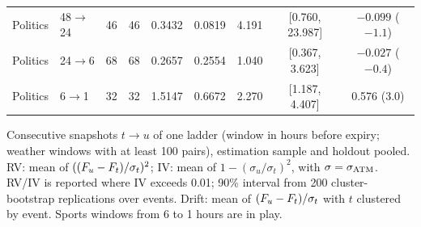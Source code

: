 \begin{table}[ht]
\begin{threeparttable}
\begin{tabular}{@{}llrrccccc@{}}
Politics & 48$\to$24 & 46 & 46 & 0.3432 & 0.0819 & 4.191 & [0.760, 23.987] & $-0.099$ ($-1.1$) \\
Politics & 24$\to$6 & 68 & 68 & 0.2657 & 0.2554 & 1.040 & [0.367, 3.623] & $-0.027$ ($-0.4$) \\
Politics & 6$\to$1 & 32 & 32 & 1.5147 & 0.6672 & 2.270 & [1.187, 4.407] & 0.576 (3.0) \\
\bottomrule
\end{tabular}
\begin{tablenotes}[flushleft]\footnotesize
\item Consecutive snapshots $t\to u$ of one ladder (window in hours before expiry; weather windows
with at least 100 pairs), estimation sample and holdout pooled. RV: mean of
$((F_u-F_t)/\sigma_t)^2$; IV: mean of $1-(\sigma_u/\sigma_t)^2$, with $\sigma=\sigma_{\mathrm{ATM}}$. RV/IV is
reported where IV exceeds 0.01; 90\% interval from 200 cluster-bootstrap replications over events.
Drift: mean of $(F_u-F_t)/\sigma_t$ with $t$ clustered by event. Sports windows from 6 to 1
hours are in play.
\end{tablenotes}
\end{threeparttable}
\end{table}


